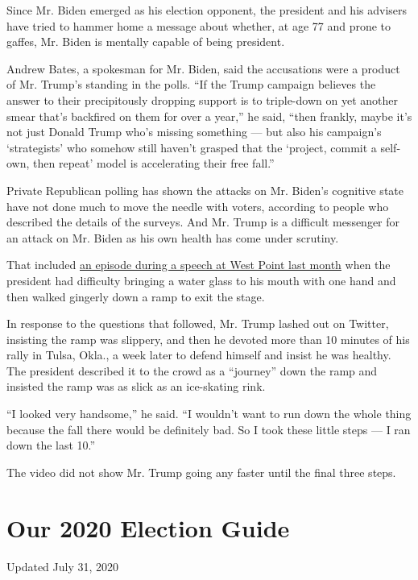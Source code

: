 Since Mr. Biden emerged as his election opponent, the president and his
advisers have tried to hammer home a message about whether, at age 77
and prone to gaffes, Mr. Biden is mentally capable of being president.

Andrew Bates, a spokesman for Mr. Biden, said the accusations were a
product of Mr. Trump's standing in the polls. ``If the Trump campaign
believes the answer to their precipitously dropping support is to
triple-down on yet another smear that's backfired on them for over a
year,'' he said, ``then frankly, maybe it's not just Donald Trump who's
missing something --- but also his campaign's `strategists' who somehow
still haven't grasped that the `project, commit a self-own, then repeat'
model is accelerating their free fall.''

Private Republican polling has shown the attacks on Mr. Biden's
cognitive state have not done much to move the needle with voters,
according to people who described the details of the surveys. And Mr.
Trump is a difficult messenger for an attack on Mr. Biden as his own
health has come under scrutiny.

That included
\href{https://www.nytimes.com/2020/06/14/us/politics/trump-ramp-water-glass-health.html}{an
episode during a speech at West Point last month} when the president had
difficulty bringing a water glass to his mouth with one hand and then
walked gingerly down a ramp to exit the stage.

In response to the questions that followed, Mr. Trump lashed out on
Twitter, insisting the ramp was slippery, and then he devoted more than
10 minutes of his rally in Tulsa, Okla., a week later to defend himself
and insist he was healthy. The president described it to the crowd as a
``journey'' down the ramp and insisted the ramp was as slick as an
ice-skating rink.

``I looked very handsome,'' he said. ``I wouldn't want to run down the
whole thing because the fall there would be definitely bad. So I took
these little steps --- I ran down the last 10.''

The video did not show Mr. Trump going any faster until the final three
steps.

\hypertarget{our-2020-election-guide}{%
\section{Our 2020 Election Guide}\label{our-2020-election-guide}}

Updated July 31, 2020

